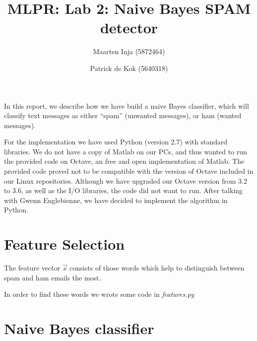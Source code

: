 \documentclass[a4paper,11pt]{article}
\author{Maarten Inja (5872464) \and Patrick de Kok (5640318)}
\title{MLPR: Lab 2: Naive Bayes SPAM detector}
\begin{document}
\maketitle

In this report, we describe how we have build a naive Bayes classifier, which will classify text messages as either ``spam'' (unwanted messages), or ham (wanted messages).  

For the implementation we have used Python (version 2.7) with standard libraries.  We do not have a copy of Matlab on our PCs, and thus wanted to run the provided code on Octave, an free and open implementation of Matlab.  The provided code proved not to be compatible with the version of Octave included in our Linux repositories.  Although we have upgraded our Octave version from 3.2 to 3.6, as well as the I/O libraries, the code did not want to run.  After talking with Gwenn Englebienne, we have decided to implement the algorithm in Python. 

\section*{Feature Selection}
The feature vector $\vec{x}$ consists of those words which 
help to distinguish between spam and ham emails the most. 

In order to find these words we wrote some code in \textit{features.py}

\section*{Naive Bayes classifier}
\end{document}
